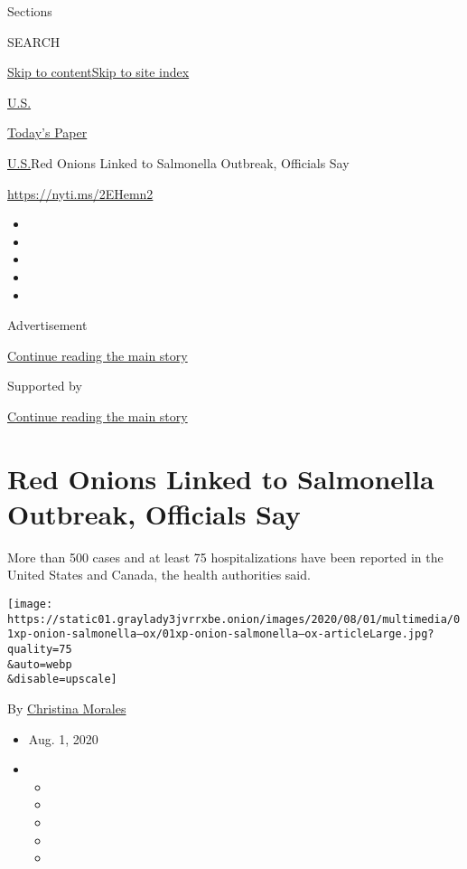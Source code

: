 Sections

SEARCH

\protect\hyperlink{site-content}{Skip to
content}\protect\hyperlink{site-index}{Skip to site index}

\href{https://www.nytimes3xbfgragh.onion/section/us}{U.S.}

\href{https://myaccount.nytimes3xbfgragh.onion/auth/login?response_type=cookie\&client_id=vi}{}

\href{https://www.nytimes3xbfgragh.onion/section/todayspaper}{Today's
Paper}

\href{/section/us}{U.S.}\textbar{}Red Onions Linked to Salmonella
Outbreak, Officials Say

\url{https://nyti.ms/2EHemn2}

\begin{itemize}
\item
\item
\item
\item
\item
\end{itemize}

Advertisement

\protect\hyperlink{after-top}{Continue reading the main story}

Supported by

\protect\hyperlink{after-sponsor}{Continue reading the main story}

\hypertarget{red-onions-linked-to-salmonella-outbreak-officials-say}{%
\section{Red Onions Linked to Salmonella Outbreak, Officials
Say}\label{red-onions-linked-to-salmonella-outbreak-officials-say}}

More than 500 cases and at least 75 hospitalizations have been reported
in the United States and Canada, the health authorities said.

\texttt{[image: https://static01.graylady3jvrrxbe.onion/images/2020/08/01/multimedia/01xp-onion-salmonella--ox/01xp-onion-salmonella--ox-articleLarge.jpg?quality=75\\\&auto=webp\\\&disable=upscale]}

By
\href{https://www.nytimes3xbfgragh.onion/by/christina-morales}{Christina
Morales}

\begin{itemize}
\item
  Aug. 1, 2020
\item
  \begin{itemize}
  \item
  \item
  \item
  \item
  \item
  \end{itemize}
\end{itemize}


